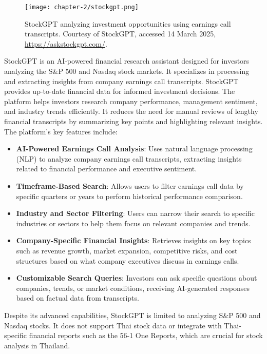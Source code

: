 \begin{figure}[h]
    \centering
    \texttt{[image: chapter-2/stockgpt.png]}
    \caption[StockGPT analyzing investment opportunities]{StockGPT analyzing investment opportunities using earnings call transcripts. Courtesy of StockGPT, accessed 14 March 2025, \url{https://askstockgpt.com/}.}
    \label{fig:stockgpt}
\end{figure}

\FloatBarrier

StockGPT is an AI-powered financial research assistant designed for investors analyzing the S\&P 500 and Nasdaq stock markets. 
It specializes in processing and extracting insights from company earnings call transcripts. StockGPT provides up-to-date financial data for informed investment decisions. 
The platform helps investors research company performance, management sentiment, and industry trends efficiently. It reduces the need for manual reviews of lengthy financial 
transcripts by summarizing key points and highlighting relevant insights. The platform's key features include:

\begin{itemize}[leftmargin=60pt]
    \item \textbf{AI-Powered Earnings Call Analysis}: Uses natural language processing (NLP) to analyze company earnings call transcripts, extracting insights related to financial performance and executive sentiment.
    \item \textbf{Timeframe-Based Search}: Allows users to filter earnings call data by specific quarters or years to perform historical performance comparison.
    \item \textbf{Industry and Sector Filtering}: Users can narrow their search to specific industries or sectors to help them focus on relevant companies and trends.
    \item \textbf{Company-Specific Financial Insights}: Retrieves insights on key topics such as revenue growth, market expansion, competitive risks, and cost structures based on what company executives discuss in earnings calls.
    \item \textbf{Customizable Search Queries}: Investors can ask specific questions about companies, trends, or market conditions, receiving AI-generated responses based on factual data from transcripts.
\end{itemize}

Despite its advanced capabilities, StockGPT is limited to analyzing S\&P 500 and Nasdaq stocks. It does not support Thai stock data or integrate with Thai-specific financial reports such as 
the 56-1 One Reports, which are crucial for stock analysis in Thailand\cite{StockGPTWebsite}.

